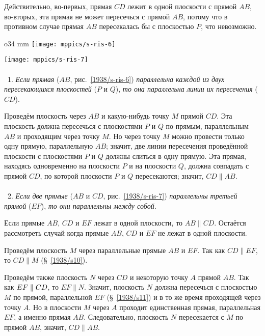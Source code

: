 Действительно, во-первых, прямая $CD$ лежит в одной плоскости с прямой $AB$, во-вторых, эта прямая не может пересечься с прямой $AB$, потому что в противном случае прямая $AB$ пересекалась бы с плоскостью $P$, что невозможно.


{

\begin{wrapfigure}[21]{o}{34 mm}
\vskip-6mm
\centering
\texttt{[image: mppics/s-ris-6]}
\caption{}\label{1938/s-ris-6}
\bigskip
\texttt{[image: mppics/s-ris-7]}
\caption{}\label{1938/s-ris-7}
\end{wrapfigure}

\paragraph{}\label{1938/s12}
\mbox{ 1.}
\emph{Если прямая} ($AB$, рис.~\ref{1938/s-ris-6}) \emph{параллельна каждой из двух пересекающихся плоскостей} ($P$ и $Q$), \emph{то она параллельна линии их пересечения} ($CD$).

Проведём плоскость через $AB$ и какую-нибудь точку $M$ прямой $CD$.
Эта плоскость должна пересечься с плоскостями $P$ и $Q$ по прямым, параллельным $AB$ и проходящим через точку $M$.
Но через точку $M$ можно провести только одну прямую, параллельную $AB$;
значит, две линии пересечения проведённой плоскости с плоскостями $P$ и $Q$ должны слиться в одну прямую.
Эта прямая, находясь одновременно на плоскости $P$ и на плоскости $Q$, должна совпадать с прямой $CD$, по которой плоскости $P$ и $Q$ пересекаются;
значит, $CD \parallel AB$.

\paragraph{}\label{1938/s13}
\mbox{ 2.}
\emph{Если две прямые} ($AB$ и $CD$, рис.~\ref{1938/s-ris-7}) \emph{параллельны третьей прямой} ($EF$), \emph{то они параллельны между собой.}

Если прямые $AB$, $CD$ и $EF$ лежат в одной плоскости, то $AB\parallel CD$.
Остаётся рассмотреть случай когда прямые $AB$, $CD$ и $EF$ не лежат в одной плоскости.

Проведём плоскость $M$ через параллельные прямые $AB$ и $EF$.
Так как $CD \parallel EF$, то $CD \parallel M$ (§~\ref{1938/s10}).

}

Проведём также плоскость $N$ через $CD$ и некоторую точку $A$ прямой $AB$.
Так как $EF\z\parallel CD$, то $EF\parallel N$.
Значит, плоскость $N$ должна пересечься с плоскостью $M$ по прямой, параллельной $EF$ (§~\ref{1938/s11}) и в то же время проходящей через точку $A$.
Но в плоскости $M$ через $A$ проходит единственная прямая, параллельная $EF$, а именно прямая $AB$.
Следовательно, плоскость $N$ пересекается с $M$ по прямой $AB$, значит, $CD \parallel AB$.


